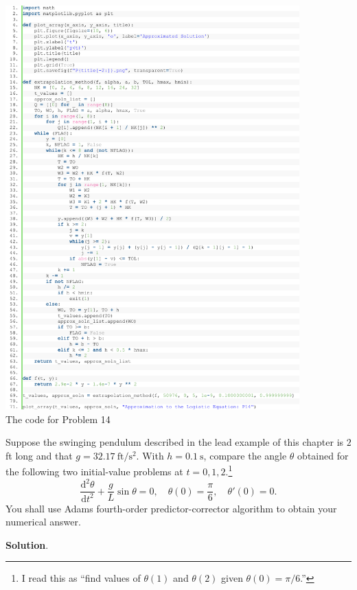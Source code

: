 \documentclass[11pt]{article}
\theoremstyle{break}
\newcommand{\dd}{\text{d}}
\numberwithin{equation}{theorem}
\begin{document}
\begin{center}
    \includegraphics[width=0.85\textwidth]{P14 code.png}\\
    The code for Problem 14
\end{center}

\newpage
\begin{problem}\label{problem 15} %
    Suppose the swinging pendulum described in the lead example of this chapter is $2$ ft long and that $g = 32.17\ \text{ft}/\text{s}^2$. With $h = 0.1\ \text{s}$, compare the angle $\theta$ obtained for the following two initial-value problems at $t = 0, 1, 2$.\footnote{I read this as ``find values of $\theta(1)$ and $\theta(2)$ given $\theta(0)=\pi/6$.''} $$\dfrac{\dd^2\theta}{\dd t^2}+\dfrac{g}{L}\sin\theta=0, \quad \theta(0)=\dfrac{\pi}{6},\quad \theta'(0)=0.$$ You shall use Adams fourth-order predictor-corrector algorithm to obtain your numerical answer.
\end{problem}
\textbf{Solution}. 
\end{document}
